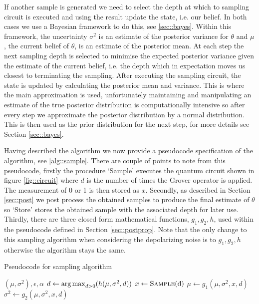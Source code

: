 If another sample is generated we need to select the depth at which to sampling circuit is executed and using the result update the state, i.e. our belief. In both cases we use a Bayesian framework to do this, see \ref{sec::bayes}. Within this framework, the uncertainty $\sigma^2$ is an estimate of the posterior variance for $\theta$ and $\mu$, the current belief of $\theta$, is an estimate of the posterior mean. At each step the next sampling depth is selected to minimise the expected posterior variance given the estimate of the current belief, i.e. the depth which in expectation moves us closest to terminating the sampling. After executing the sampling circuit, the state is updated by calculating the posterior mean and variance. This is where the main approximation is used, unfortunately maintaining and manipulating  an estimate of the true posterior distribution is computationally intensive so after every step we approximate the posterior distribution by a normal distribution. This is then used as the prior distribution for the next step, for more details see Section \ref{sec::bayes}.

Having described the algorithm we now provide a pseudocode specification of the algorithm, see \ref{alg::sample}. There are couple of points to note from this pseudocode, firstly the procedure `Sample' executes the quantum circuit shown in figure \ref{fig::circuit} where $d$ is the number of times the Grover operator is applied. The measurement of 0 or 1 is then stored as $x$. Secondly, as described in Section \ref{sec::post} we post process the obtained samples to produce the final estimate of $\theta$ so `Store' stores the obtained sample with the associated depth for later use.  Thirdly, there are three closed form mathematical functions, $g_1,g_2,h$, used within the pseudocode defined in Section \ref{sec::postprop}. Note that the only change to this sampling algorithm when considering the depolarizing noise is to $g_1,g_2,h$ otherwise the algorithm stays the same.

\begin{algorithm}
	\caption{Pseudocode for sampling algorithm }\label{alg::sample}
	\begin{algorithmic}
		\Require $(\mu, \sigma^2), \epsilon, \alpha$
		 
		\State $d \gets \operatorname*{arg\,max}_{d>0}(h(\mu,\sigma^2,d))$ 
		\State $x\gets \Call{Sample}{$d$}$
		\State $\mu \gets g_1(\mu,\sigma^2,x,d)$
		\State $\sigma^2 \gets g_2(\mu,\sigma^2,x,d)$ 
		\State {} 
		\EndWhile
	\end{algorithmic}
\end{algorithm}

